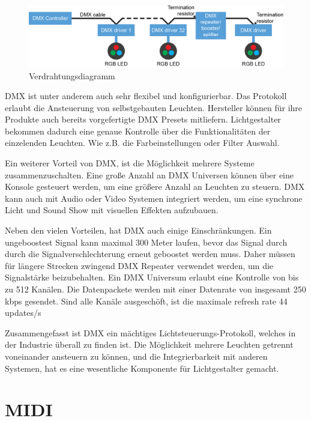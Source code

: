\begin{figure}[H]
	\centering
	\includegraphics[width=.9\linewidth]{Pictures/dmxWiringDiagram}
	\caption{Verdrahtungsdiagramm \cite[p.64]{DMX_Wiring}}
	\label{fig:dmx_wiring diagram}
\end{figure}

DMX ist unter anderem auch sehr flexibel und konfigurierbar. Das Protokoll erlaubt die Ansteuerung von selbstgebauten Leuchten. Hersteller können für ihre Produkte auch bereits vorgefertigte DMX Presets mitliefern. Lichtgestalter bekommen dadurch eine genaue Kontrolle über die Funktionalitäten der einzelenden Leuchten. Wie z.B. die Farbeinstellungen oder Filter Auswahl.

Ein weiterer Vorteil von DMX, ist die Möglichkeit mehrere Systeme zusammenzuschalten. Eine große Anzahl an DMX Universen können über eine Konsole gesteuert werden, um eine größere Anzahl an Leuchten zu steuern. DMX kann auch mit Audio oder Video Systemen integriert werden, um eine synchrone Licht und Sound Show mit visuellen Effekten aufzubauen.

Neben den vielen Vorteilen, hat DMX auch einige Einschränkungen. Ein ungeboostest Signal kann maximal 300 Meter laufen, bevor das Signal durch durch die Signalverschlechterung erneut geboostet werden muss. Daher müssen für längere Strecken zwingend DMX Repeater verwendet werden, um die Signalstärke beizubehalten. Ein DMX Universum erlaubt eine Kontrolle von bis zu 512 Kanälen. Die Datenpackete werden mit einer Datenrate von insgesamt 250 kbps gesendet. Sind alle Kanäle ausgeschöft, ist die maximale refresh rate 44 updates/s \cite[p. 18, table6]{DMX512-Protocol-Standard}

Zusammengefasst ist DMX ein mächtiges Lichtsteuerungs-Protokoll, welches in der Industrie überall zu finden ist. Die Möglichkeit mehrere Leuchten getrennt voneinander ansteuern zu können, und die Integrierbarkeit mit anderen Systemen, hat es eine wesentliche Komponente für Lichtgestalter gemacht.


\section{MIDI}

